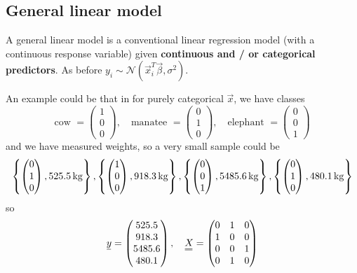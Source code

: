 \subsection{General linear model}
A general linear model is a conventional linear regression model
(with a continuous response variable) given \textbf{continuous and / or
categorical predictors}. As before $y_i \sim \mathcal{N}(\vec{x}_i^T \vec{\beta}, \sigma^2)$.

An example could be that in for purely categorical $\vec{x}$, we have classes
\begin{equation}
    \text{cow } = \begin{pmatrix} 1 \\ 0 \\ 0 \end{pmatrix}, \quad \text{manatee } = \begin{pmatrix} 0 \\ 1 \\ 0 \end{pmatrix}, \quad \text{elephant } = \begin{pmatrix} 0 \\ 0 \\ 1 \end{pmatrix}
\end{equation}
and we have measured weights, so a very small sample could be
\begin{equation}
    \left\{ \begin{pmatrix} 0 \\ 1 \\ 0 \end{pmatrix}, 525.5\operatorname{kg} \right\}, \left\{ \begin{pmatrix} 1 \\ 0 \\ 0 \end{pmatrix}, 918.3\operatorname{kg} \right\}, \left\{ \begin{pmatrix} 0 \\ 0 \\ 1 \end{pmatrix}, 5485.6\operatorname{kg} \right\}, \left\{ \begin{pmatrix} 0 \\ 1 \\ 0 \end{pmatrix}, 480.1\operatorname{kg} \right\}
\end{equation}
so
\begin{equation}
    \begin{gathered}
        \vec{y} = \begin{pmatrix} 525.5 \\ 918.3 \\ 5485.6 \\ 480.1 \end{pmatrix}, \quad \mat{X} = \begin{pmatrix} 0 & 1 & 0 \\ 1 & 0 & 0 \\ 0 & 0 & 1 \\ 0 & 1 & 0 \end{pmatrix}
    \end{gathered}
\end{equation}
